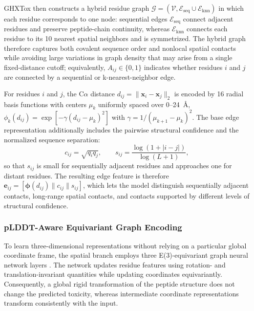 \documentclass[12pt]{article}
\begin{document}
GHXTox then constructs a hybrid residue graph
$\mathcal{G} = (\mathcal{V}, \mathcal{E}_{\mathrm{seq}} \cup
\mathcal{E}_{\mathrm{knn}})$ in which each residue corresponds to one node:
sequential edges $\mathcal{E}_{\mathrm{seq}}$ connect adjacent residues and
preserve peptide-chain continuity, whereas $\mathcal{E}_{\mathrm{knn}}$
connects each residue to its 10 nearest spatial neighbors and is symmetrized.
The hybrid graph therefore captures both covalent sequence order and nonlocal
spatial contacts while avoiding large variations in graph density that may
arise from a single fixed-distance cutoff; equivalently,
$A_{ij} \in \{0,1\}$ indicates whether residues $i$ and $j$ are connected by
a sequential or k-nearest-neighbor edge.

For residues $i$ and $j$, the C$\alpha$ distance
$d_{ij} = \lVert \mathbf x_i - \mathbf x_j \rVert_2$ is encoded by 16 radial
basis functions with centers $\mu_k$ uniformly spaced over 0--24~\AA{},
$\phi_k(d_{ij}) = \exp[-\gamma(d_{ij}-\mu_k)^2]$ with
$\gamma = 1/(\mu_{k+1}-\mu_k)^2$. The base edge representation additionally
includes the pairwise structural confidence and the normalized sequence
separation:
\begin{equation}
    c_{ij} = \sqrt{q_i q_j}, \qquad
    s_{ij} = \frac{\log(1 + |i - j|)}{\log(L + 1)},
    \label{eq:edge_feat}
\end{equation}
so that $s_{ij}$ is small for sequentially adjacent residues and approaches
one for distant residues. The resulting edge feature is therefore
$\mathbf e_{ij} = \left[\boldsymbol\phi(d_{ij}) \parallel
c_{ij} \parallel s_{ij}\right]$, which lets the model distinguish
sequentially adjacent contacts, long-range spatial contacts, and contacts
supported by different levels of structural confidence.
\subsubsection{pLDDT-Aware Equivariant Graph Encoding}
To learn three-dimensional representations without relying on a particular
global coordinate frame, the spatial branch employs three E(3)-equivariant
graph neural network layers \cite{satorras2021egnn}. The network updates
residue features using rotation- and translation-invariant quantities while
updating coordinates equivariantly. Consequently, a global rigid
transformation of the peptide structure does not change the predicted
toxicity, whereas intermediate coordinate representations transform
consistently with the input.
\end{document}
